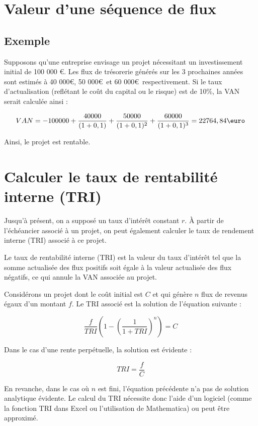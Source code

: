 \documentclass[a4paper, 12pt]{report}
\begin{document}
\section{Valeur d'une séquence de flux}

\subsection{Exemple}

Supposons qu'une entreprise envisage un projet nécessitant un investissement initial de 100 000 €. Les flux de trésorerie générés sur les 3 prochaines années sont estimés à 40 000\euro, 50 000\euro~et 60 000\euro~respectivement. Si le taux d'actualisation (reflétant le coût du capital ou le risque) est de 10\%, la VAN serait calculée ainsi :

\[
VAN = -100000 + \frac{40000}{(1+0,1)} + \frac{50000}{(1+0,1)^2} + \frac{60000}{(1+0,1)^3} = 22764,84\text{\euro}
\]

Ainsi, le projet est rentable.

\section{Calculer le taux de rentabilité interne (TRI)}

Jusqu'à présent, on a supposé un taux d'intérêt constant \( r \). À partir de l'échéancier associé à un projet, on peut également calculer le taux de rendement interne (TRI) associé à ce projet.

Le taux de rentabilité interne (TRI) est la valeur du taux d'intérêt tel que la somme actualisée des flux positifs soit égale à la valeur actualisée des flux négatifs, ce qui annule la VAN associée au projet.

Considérons un projet dont le coût initial est \( C \) et qui génère \( n \) flux de revenus égaux d'un montant \( f \). Le TRI associé est la solution de l'équation suivante :

\[
\frac{f}{TRI} \left( 1 - \left( \frac{1}{1 + TRI} \right)^{n} \right) = C
\]

Dans le cas d'une rente perpétuelle, la solution est évidente :

\[
TRI = \frac{f}{C}
\]

En revanche, dans le cas où \( n \) est fini, l'équation précédente n'a pas de solution analytique évidente. Le calcul du TRI nécessite donc l'aide d'un logiciel (comme la fonction TRI dans Excel ou l'utilisation de Mathematica) ou peut être approximé.
\end{document}
